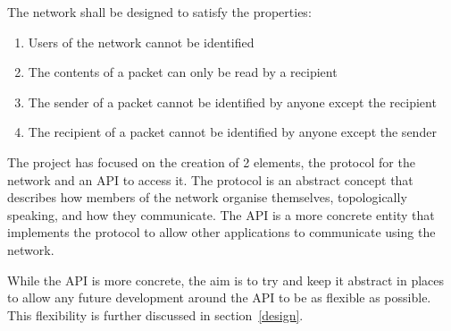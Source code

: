 	The network shall be designed to satisfy the properties:
	\begin{enumerate}[topsep=-5pt,itemsep=-1ex,partopsep=2ex,parsep=1.5ex]
		\item Users of the network cannot be identified
		\item The contents of a packet can only be read by a recipient
		\item The sender of a packet cannot be identified by anyone except the recipient
		\item The recipient of a packet cannot be identified by anyone except the sender
	\end{enumerate} \vspace{0.5ex}
	
	The project has focused on the creation of 2 elements, the protocol for the network and an API to access it. The protocol is an abstract concept that describes how members of the network organise themselves, topologically speaking, and how they communicate. The API is a more concrete entity that implements the protocol to allow other applications to communicate using the network. 
	
	While the API is more concrete, the aim is to try and keep it abstract in places to allow any future development around the API to be as flexible as possible. This flexibility is further discussed in section~\ref{design}.